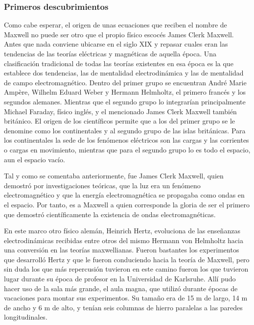 \documentclass[12pt]{article}
\begin{document}
\subsubsection{Primeros descubrimientos}
Como cabe esperar, el origen de unas ecuaciones que reciben el nombre de Maxwell no puede ser otro que el propio f\'isico escoc\'es James Clerk Maxwell. Antes que nada conviene ubicarse en el siglo XIX y repasar cuales eran las tendencias de las teor\'ias el\'ectricas y magn\'eticas de aquella \'epoca. Una clasificaci\'on tradicional de todas las teor\'ias existentes en esa \'epoca es la que establece dos tendencias, las de mentalidad electrodin\'amica y las de mentalidad de campo electromagn\'etico. Dentro del primer grupo se encuentran Andr\'e Marie Ampère, Wilhelm Eduard Weber y Hermann Helmholtz, el primero franc\'es y los segundos alemanes. Mientras que el segundo grupo lo integrar\'ian principalmente Michael Faraday, f\'isico ingl\'es, y el mencionado James Clerk Maxwell tambi\'en brit\'anico. El origen de los cient\'ificos permite que a los del primer grupo se le denomine como los continentales y al segundo grupo de las islas brit\'anicas. Para los continentales la sede de los fen\'omenos el\'ectricos son las cargas y las corrientes o cargas en movimiento, mientras que para el segundo grupo lo es todo el espacio, aun el espacio vac\'io.
\vspace{0.4cm}
	
Tal y como se comentaba anteriormente, fue James Clerk Maxwell, quien demostr\'o por investigaciones te\'oricas, que la luz era un fen\'omeno electromagn\'etico y que la energ\'ia electromagn\'etica se propagaba como ondas en el espacio. Por tanto, es a Maxwell a quien corresponde la gloria de ser el primero que demostr\'o cient\'ificamente la existencia de ondas electromagn\'eticas.
\vspace{0.4cm}
	
En este marco otro f\'isico alem\'an, Heinrich Hertz, evoluciona de las ense\~nanzas electrodin\'amicas recibidas entre otros del mismo Hermann von Helmholtz hacia una conversi\'on en las teor\'ias maxwellianas. Fueron bastantes los experimentos que desarroll\'o Hertz y que le fueron conduciendo hacia la teor\'ia de Maxwell, pero sin duda los que m\'as repercusi\'on tuvieron en este camino fueron los que tuvieron lugar durante su \'epoca de profesor en la Universidad de Karlsruhe. All\'i pudo hacer uso de la sala m\'as grande, el aula magna, que utiliz\'o durante \'epocas de vacaciones para montar sus experimentos. Su tama\~no era de 15 m de largo, 14 m de ancho y 6 m de alto, y ten\'ian seis columnas de hierro paralelas a las paredes longitudinales.
\vspace{0.4cm}
	
\end{document}
